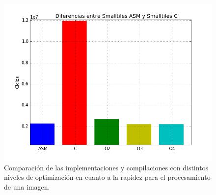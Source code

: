 \begin{figure}[h!]
\centering
\captionsetup{justification=centering}
\includegraphics[width = 15 cm, height = 12 cm]{imagenes/ASMvsCSmalltiles.png}
\caption[center]{Comparación de las implementaciones y compilaciones con distintos niveles de optimización en cuanto a la rapidez para el procesamiento de una imagen.}
\end{figure}
